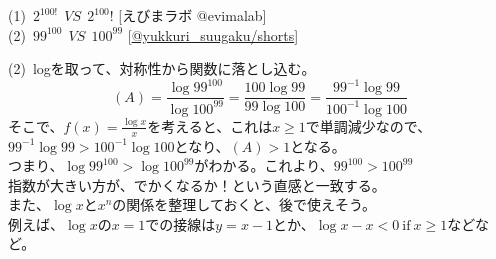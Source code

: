 \documentclass[11pt]{article}
\begin{document}
\newpage

\begin{tcolorbox}[mybox={数の大小関係の評価}]
(1)\ $\displaystyle 2^{100!} \ \ VS\ \  2^{100} !$ \hspace{1cm} [えびまラボ @evimalab]\\
(2)\ $99^{100} \ \ VS\ \  100^{99}$ \hspace{1cm} [\url{@yukkuri_suugaku/shorts}]
\end{tcolorbox}

(2)\ logを取って、対称性から関数に落とし込む。\\
\begin{equation*}
(A) = \dfrac{\log 99^{100}}{\log 100^{99}} = \dfrac{100 \log 99}{99 \log 100} =\dfrac{99^{-1} \log 99}{100^{-1} \log 100}
\end{equation*}
そこで、$\displaystyle f(x)=\frac{\log x}{x}$を考えると、これは$x \geq 1$で単調減少なので、$99^{-1} \log 99 > 100^{-1} \log 100$となり、$(A) >1$となる。\\
つまり、$\log 99^{100} > \log 100^{99}$がわかる。これより、$99^{100} > 100^{99}$\\
指数が大きい方が、でかくなるか！という直感と一致する。\\
また、$\log x$と$x^n$の関係を整理しておくと、後で使えそう。\\
例えば、$\log x$の$x=1$での接線は$y=x-1$とか、$\log x -x <0 \ \text{if}\  x \geq 1$などなど。
\end{document}
